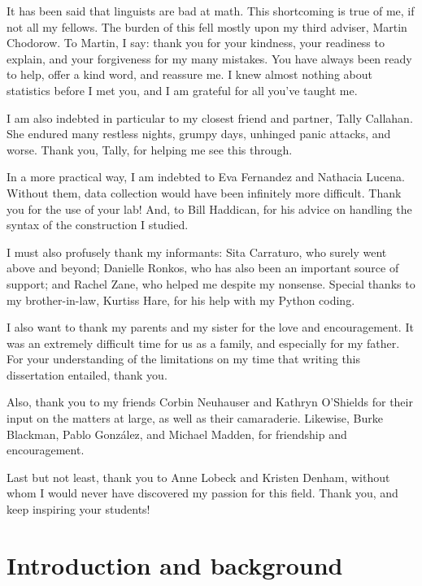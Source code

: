\documentclass[11pt,oneside]{book}
\begin{document}
It has been said that linguists are bad at math. This shortcoming is true of me, if not all my fellows. The burden of this fell mostly upon my third adviser, Martin Chodorow. To Martin, I say: thank you for your kindness, your readiness to explain, and your forgiveness for my many mistakes. You have always been ready to help, offer a kind word, and reassure me. I knew almost nothing about statistics before I met you, and I am grateful for all you've taught me.

I am also indebted in particular to my closest friend and partner, Tally Callahan. She endured many restless nights, grumpy days, unhinged panic attacks, and worse. Thank you, Tally, for helping me see this through.

In a more practical way, I am indebted to Eva Fernandez and Nathacia Lucena. Without them, data collection would have been infinitely more difficult. Thank you for the use of your lab! And, to Bill Haddican, for his advice on handling the syntax of the construction I studied. 

I must also profusely thank my informants: Sita Carraturo, who surely went above and beyond; Danielle Ronkos, who has also been an important source of support; and Rachel Zane, who helped me despite my nonsense. Special thanks to my brother-in-law, Kurtiss Hare, for his help with my Python coding.

I also want to thank my parents and my sister for the love and encouragement. It was an extremely difficult time for us as a family, and especially for my father. For your understanding of the limitations on my time that writing this dissertation entailed, thank you. 

Also, thank you to my friends Corbin Neuhauser and Kathryn O’Shields for their input on the matters at large, as well as their camaraderie. Likewise, Burke Blackman, Pablo Gonz\'{a}lez, and Michael Madden, for friendship and encouragement.

Last but not least, thank you to Anne Lobeck and Kristen Denham, without whom I would never have discovered my passion for this field. Thank you, and keep inspiring your students!

\pagebreak

{
\setcounter{tocdepth}{1}
\tableofcontents
}
\listoftables
\listoffigures
\pagebreak

\setlength\parindent{24pt}\setlength{\parskip}{0.0pt plus 1.0pt}


\hypertarget{introduction-and-background}{%
\chapter{Introduction and background}\label{introduction-and-background}}
\end{document}
